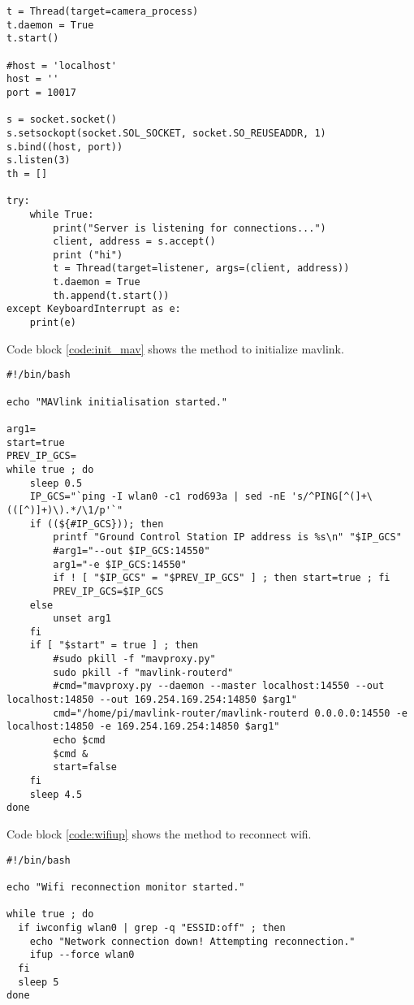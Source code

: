 \begin{appendices}
\begin{lstlisting}
t = Thread(target=camera_process)
t.daemon = True
t.start()

#host = 'localhost'
host = ''
port = 10017

s = socket.socket()
s.setsockopt(socket.SOL_SOCKET, socket.SO_REUSEADDR, 1)
s.bind((host, port))
s.listen(3)
th = []

try:
    while True:
        print("Server is listening for connections...")
        client, address = s.accept()
        print ("hi")
        t = Thread(target=listener, args=(client, address))
        t.daemon = True
        th.append(t.start())
except KeyboardInterrupt as e:
    print(e)
\end{lstlisting}

Code block \ref{code:init_mav} shows the method to initialize mavlink.

\begin{lstlisting}
#!/bin/bash

echo "MAVlink initialisation started."

arg1=
start=true
PREV_IP_GCS=
while true ; do
	sleep 0.5
	IP_GCS="`ping -I wlan0 -c1 rod693a | sed -nE 's/^PING[^(]+\(([^)]+)\).*/\1/p'`"
	if ((${#IP_GCS})); then
		printf "Ground Control Station IP address is %s\n" "$IP_GCS"
		#arg1="--out $IP_GCS:14550"
		arg1="-e $IP_GCS:14550"
		if ! [ "$IP_GCS" = "$PREV_IP_GCS" ] ; then start=true ; fi
		PREV_IP_GCS=$IP_GCS
	else
		unset arg1
	fi
	if [ "$start" = true ] ; then
		#sudo pkill -f "mavproxy.py"
		sudo pkill -f "mavlink-routerd"
		#cmd="mavproxy.py --daemon --master localhost:14550 --out localhost:14850 --out 169.254.169.254:14850 $arg1"
		cmd="/home/pi/mavlink-router/mavlink-routerd 0.0.0.0:14550 -e localhost:14850 -e 169.254.169.254:14850 $arg1"
		echo $cmd
		$cmd &
		start=false
	fi
	sleep 4.5
done

\end{lstlisting}

Code block \ref{code:wifiup} shows the method to reconnect wifi.

\begin{lstlisting}
#!/bin/bash

echo "Wifi reconnection monitor started."

while true ; do
  if iwconfig wlan0 | grep -q "ESSID:off" ; then
    echo "Network connection down! Attempting reconnection."
    ifup --force wlan0
  fi
  sleep 5
done

\end{lstlisting}


\end{appendices}

